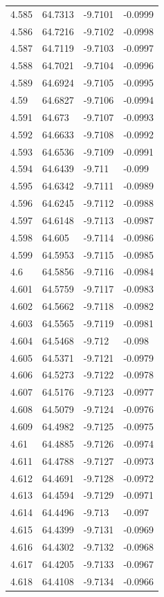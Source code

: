\begin{tabular}{llll}
4.585 & 64.7313 & -9.7101 & -0.0999 \\
4.586 & 64.7216 & -9.7102 & -0.0998 \\
4.587 & 64.7119 & -9.7103 & -0.0997 \\
4.588 & 64.7021 & -9.7104 & -0.0996 \\
4.589 & 64.6924 & -9.7105 & -0.0995 \\
4.59 & 64.6827 & -9.7106 & -0.0994 \\
4.591 & 64.673 & -9.7107 & -0.0993 \\
4.592 & 64.6633 & -9.7108 & -0.0992 \\
4.593 & 64.6536 & -9.7109 & -0.0991 \\
4.594 & 64.6439 & -9.711 & -0.099 \\
4.595 & 64.6342 & -9.7111 & -0.0989 \\
4.596 & 64.6245 & -9.7112 & -0.0988 \\
4.597 & 64.6148 & -9.7113 & -0.0987 \\
4.598 & 64.605 & -9.7114 & -0.0986 \\
4.599 & 64.5953 & -9.7115 & -0.0985 \\
4.6 & 64.5856 & -9.7116 & -0.0984 \\
4.601 & 64.5759 & -9.7117 & -0.0983 \\
4.602 & 64.5662 & -9.7118 & -0.0982 \\
4.603 & 64.5565 & -9.7119 & -0.0981 \\
4.604 & 64.5468 & -9.712 & -0.098 \\
4.605 & 64.5371 & -9.7121 & -0.0979 \\
4.606 & 64.5273 & -9.7122 & -0.0978 \\
4.607 & 64.5176 & -9.7123 & -0.0977 \\
4.608 & 64.5079 & -9.7124 & -0.0976 \\
4.609 & 64.4982 & -9.7125 & -0.0975 \\
4.61 & 64.4885 & -9.7126 & -0.0974 \\
4.611 & 64.4788 & -9.7127 & -0.0973 \\
4.612 & 64.4691 & -9.7128 & -0.0972 \\
4.613 & 64.4594 & -9.7129 & -0.0971 \\
4.614 & 64.4496 & -9.713 & -0.097 \\
4.615 & 64.4399 & -9.7131 & -0.0969 \\
4.616 & 64.4302 & -9.7132 & -0.0968 \\
4.617 & 64.4205 & -9.7133 & -0.0967 \\
4.618 & 64.4108 & -9.7134 & -0.0966 \\

\end{tabular}
